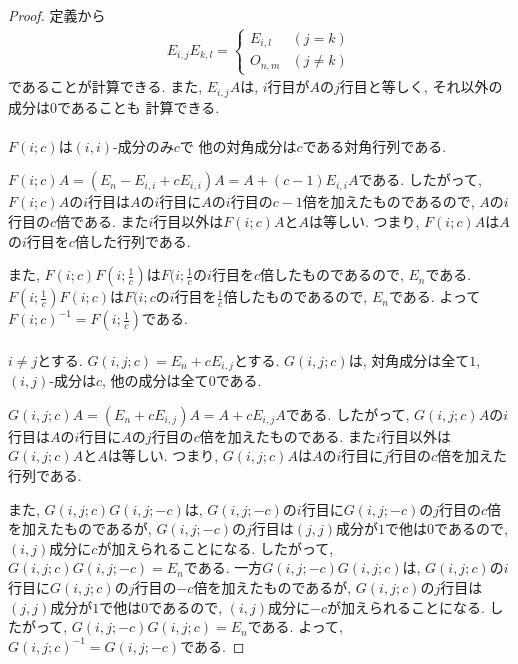 \begin{proof}
  定義から
  \begin{align*}
    E_{i,j}E_{k,l}=
    \begin{cases}
      E_{i,l}&(j=k)\\
      O_{n,m}&(j\neq k)
    \end{cases}
  \end{align*}
  であることが計算できる.
  また,
  $E_{i,j}A$は, $i$行目が$A$の$j$行目と等しく, それ以外の成分は$0$であることも
  計算できる.
  \paragraph{}
  $F(i;c)$は$(i,i)$-成分のみ$c$で
  他の対角成分は$c$である対角行列である.

 
  $F(i;c)A=(E_n-E_{i,i}+cE_{i,i})A=A+(c-1)E_{i,i}A$である.
  したがって, $F(i;c)A$の$i$行目は$A$の$i$行目に$A$の$i$行目の$c-1$倍を加えたものであるので,
  $A$の$i$行目の$c$倍である.
  また$i$行目以外は$F(i;c)A$と$A$は等しい.
  つまり,
  $F(i;c)A$は$A$の$i$行目を$c$倍した行列である.

  また, $F(i;c)F(i;\frac{1}{c})$は$F(i;\frac{1}{c}$の$i$行目を$c$倍したものであるので,
  $E_n$である.
  $F(i;\frac{1}{c})F(i;c)$は$F(i;c$の$i$行目を$\frac{1}{c}$倍したものであるので,
  $E_n$である.
  よって$F(i;c)^{-1}=F(i;\frac{1}{c})$である.

  \paragraph{}
  $i\neq j$とする. $G(i,j;c)=E_n+cE_{i,j}$とする.
  $G(i,j;c)$は, 対角成分は全て$1$, $(i,j)$-成分は$c$, 他の成分は全て$0$である.

  $G(i,j;c)A=(E_n+cE_{i,j})A=A+cE_{i,j}A$である.
  したがって, $G(i,j;c)A$の$i$行目は$A$の$i$行目に$A$の$j$行目の$c$倍を加えたものである.
  また$i$行目以外は$G(i,j;c)A$と$A$は等しい.
  つまり, $G(i,j;c)A$は$A$の$i$行目に$j$行目の$c$倍を加えた行列である.

  また, $G(i,j;c)G(i,j;-c)$は, $G(i,j;-c)$の$i$行目に$G(i,j;-c)$の$j$行目の$c$倍を加えたものであるが, $G(i,j;-c)$の$j$行目は$(j,j)$成分が$1$で他は$0$であるので,
  $(i,j)$成分に$c$が加えられることになる.
  したがって, $G(i,j;c)G(i,j;-c)=E_n$である.
  一方$G(i,j;-c)G(i,j;c)$は, $G(i,j;c)$の$i$行目に$G(i,j;c)$の$j$行目の$-c$倍を加えたものであるが, $G(i,j;c)$の$j$行目は$(j,j)$成分が$1$で他は$0$であるので,
  $(i,j)$成分に$-c$が加えられることになる.
  したがって, $G(i,j;-c)G(i,j;c)=E_n$である.
  よって, $G(i,j;c)^{-1}=G(i,j;-c)$である.
  

\end{proof}
